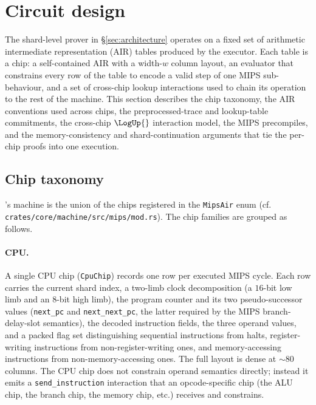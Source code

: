 \section{Circuit design}
\label{sec:circuit-design}

The shard-level prover in \S\ref{sec:architecture} operates on a fixed set of arithmetic intermediate representation (AIR) tables produced by the executor. Each table is a chip: a self-contained AIR with a width-$w$ column layout, an evaluator that constrains every row of the table to encode a valid step of one MIPS sub-behaviour, and a set of cross-chip lookup interactions used to chain its operation to the rest of the machine. This section describes the chip taxonomy, the AIR conventions used across chips, the preprocessed-trace and lookup-table commitments, the cross-chip $\LogUp{}$ interaction model, the MIPS precompiles, and the memory-consistency and shard-continuation arguments that tie the per-chip proofs into one execution.

\subsection{Chip taxonomy}

\Zirenver{}'s machine is the union of the chips registered in the \texttt{MipsAir} enum (cf. \texttt{crates/core/machine/src/mips/mod.rs}). The chip families are grouped as follows.

\paragraph{CPU.} A single CPU chip (\texttt{CpuChip}) records one row per executed MIPS cycle. Each row carries the current shard index, a two-limb clock decomposition (a $16$-bit low limb and an $8$-bit high limb), the program counter and its two pseudo-successor values (\texttt{next\_pc} and \texttt{next\_next\_pc}, the latter required by the MIPS branch-delay-slot semantics), the decoded instruction fields, the three operand values, and a packed flag set distinguishing sequential instructions from halts, register-writing instructions from non-register-writing ones, and memory-accessing instructions from non-memory-accessing ones. The full layout is dense at $\sim 80$ columns. The CPU chip does not constrain operand semantics directly; instead it emits a \texttt{send\_instruction} interaction that an opcode-specific chip (the ALU chip, the branch chip, the memory chip, etc.) receives and constrains.

